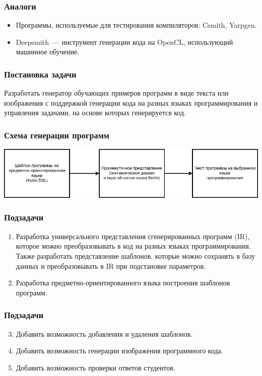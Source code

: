 \documentclass[14pt,aspectratio=169,hyperref={pdftex,unicode},xcolor=dvipsnames]{beamer}
\begin{document}
\begin{frame}
    \frametitle{Аналоги}
    \begin{itemize}
        \item Программы, используемые для тестирования компиляторов: Csmith, Yarpgen.
        \item Deepsmith~--- инструмент генерации кода на OpenCL, использующий машинное обучение.
    \end{itemize}
\end{frame}

\begin{frame}
    \frametitle{Постановка задачи}
    Разработать генератор обучающих примеров программ в виде текста или изображения с поддержкой
    генерации кода на разных языках программирования и управления задачами, на основе
    которых генерируется код.
\end{frame}

\begin{frame}
    \frametitle{Схема генерации программ}
    \begin{center}
        \includegraphics[width=\textwidth]{images/generation-steps.drawio.png}
    \end{center}
\end{frame}

\begin{frame}
    \frametitle{Подзадачи}
    \begin{enumerate}
        \item Разработка универсального представления сгенерированных программ (IR), которое можно
              преобразовывать в код на разных языках программирования. Также разработать представление шаблонов,
              которые можно сохранять в базу данных и преобразовывать в IR при подстановке параметров.
        \item Разработка предметно-ориентированного языка построения шаблонов программ.
    \end{enumerate}
\end{frame}

\begin{frame}
    \frametitle{Подзадачи}
    \begin{enumerate}
        \setcounter{enumi}{2}
        \item Добавить возможность добавления и удаления шаблонов.
        \item Добавить возможность генерации изображения программного кода.
        \item Добавить возможность проверки ответов студентов.
    \end{enumerate}
\end{frame}
\end{document}
